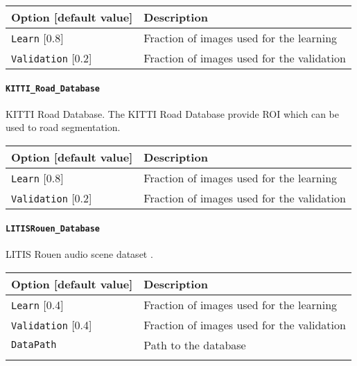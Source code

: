 \documentclass[a4paper,11pt,oneside]{article}
\begin{document}
\begin{center}
 \begin{tabular}{| p{5cm} | p{10cm} | }
 \hline
 Option [default value] & Description\\
 \hline\hline
  \cellcolor{requiredcolor}
  \lstinline!Learn! [0.8] & Fraction of images used for the learning \\
  \lstinline!Validation! [0.2] & Fraction of images used for the validation \\
 \hline
\end{tabular}
\end{center}

\paragraph{\texorpdfstring{%
\lstinline[basicstyle=\ttfamily\bfseries]!KITTI_Road_Database!}
{KITTI_Road\_Database}}
KITTI Road Database.
The KITTI Road Database provide ROI which can be used to road segmentation.

\begin{center}
 \begin{tabular}{| p{5cm} | p{10cm} | }
 \hline
 Option [default value] & Description\\
 \hline\hline
  \cellcolor{requiredcolor}
  \lstinline!Learn! [0.8] & Fraction of images used for the learning \\
  \lstinline!Validation! [0.2] & Fraction of images used for the validation \\
 \hline
\end{tabular}
\end{center}

\paragraph{\texorpdfstring{%
\lstinline[basicstyle=\ttfamily\bfseries]!LITISRouen_Database!}
{LITISRouen\_Database}}
LITIS Rouen audio scene dataset \citep{Rakotomamonjy2014}.

\begin{center}
 \begin{tabular}{| p{5cm} | p{10cm} | }
 \hline
 Option [default value] & Description\\
 \hline\hline
  \lstinline!Learn! [0.4] & Fraction of images used for the learning \\
  \lstinline!Validation! [0.4] & Fraction of images used for the validation \\
  \lstinline!DataPath! & Path to the database \\
   & \\
 \hline
\end{tabular}
\end{center}
\end{document}
